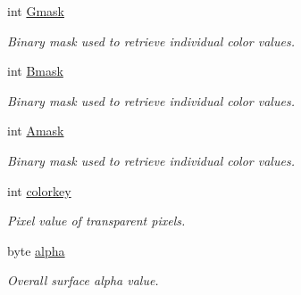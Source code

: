 \begin{DoxyCompactItemize}
int \hyperlink{struct_s_d_l___pixel_format_a4a058dff33543ce36cfcf3f2771b40c4}{Gmask}
\begin{DoxyCompactList}\small\item\em Binary mask used to retrieve individual color values. \item\end{DoxyCompactList}\item 
int \hyperlink{struct_s_d_l___pixel_format_a491f4f2d29b60b352ab7a4ce3b8e14de}{Bmask}
\begin{DoxyCompactList}\small\item\em Binary mask used to retrieve individual color values. \item\end{DoxyCompactList}\item 
int \hyperlink{struct_s_d_l___pixel_format_a8016d769695a8ce1deee3f44aeb96fa6}{Amask}
\begin{DoxyCompactList}\small\item\em Binary mask used to retrieve individual color values. \item\end{DoxyCompactList}\item 
int \hyperlink{struct_s_d_l___pixel_format_ab4cf7cddc2293f9b6bb61bb60d06ad5d}{colorkey}
\begin{DoxyCompactList}\small\item\em Pixel value of transparent pixels. \item\end{DoxyCompactList}\item 
byte \hyperlink{struct_s_d_l___pixel_format_ac0061b3c0c1a204355fb51aba66ff830}{alpha}
\begin{DoxyCompactList}\small\item\em Overall surface alpha value. \item\end{DoxyCompactList}\end{DoxyCompactItemize}


